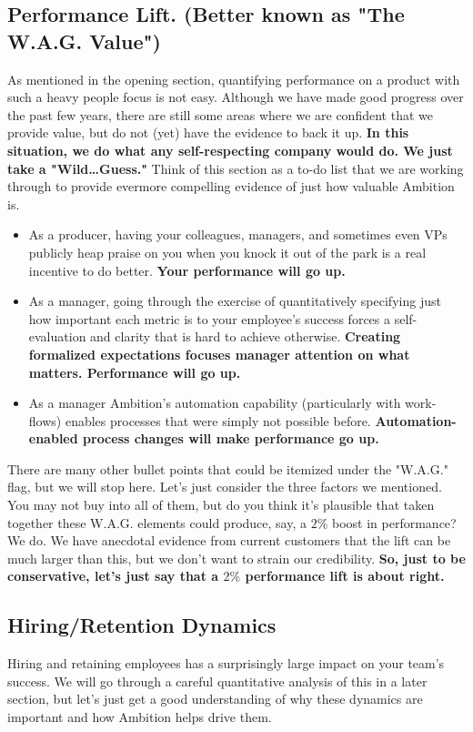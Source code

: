 \documentclass[paper=a4, fontsize=11pt abstract]{scrartcl}
\numberwithin{equation}{section}		%
\numberwithin{figure}{section}			%
\numberwithin{table}{section}				%
\begin{document}
\subsection{Performance Lift. (Better known as "The W.A.G. Value")}
As mentioned in the opening section, quantifying performance on a product with such a heavy people focus is not easy.  Although we have made good progress over the past few years, there are still some areas where we are confident that we provide value, but do not (yet) have the evidence to back it up.  \textbf{In this situation, we do what any self-respecting company would do. We just take a "Wild\ldots Guess."} Think of this section as a to-do list that we are working through to provide evermore compelling evidence of just how valuable Ambition is.
\begin{itemize}
    \item As a producer, having your colleagues, managers, and sometimes even VPs publicly heap praise on you when you knock it out of the park is a real incentive to do better.  \textbf{Your performance will go up.} 
    
    \item As a manager, going through the exercise of quantitatively specifying just how important each metric is to your employee's success forces a self-evaluation and clarity that is hard to achieve otherwise. \textbf{Creating formalized expectations focuses manager attention on what matters.  Performance will go up.}
    
    \item As a manager Ambition's automation capability (particularly with work-flows) enables processes that were simply not possible before. \textbf{Automation-enabled process changes will make performance go up.}
\end{itemize}

There are many other bullet points that could be itemized under the "W.A.G." flag, but we will stop here.  Let's just consider the three factors we mentioned.  You may not buy into all of them, but do you think it's plausible that taken together these W.A.G. elements could produce, say,  a $2\%$ boost in performance?  We do. We have anecdotal evidence from current customers that the lift can be much larger than this, but we don't want to strain our credibility. \textbf{So, just to be conservative, let's just say that a $2\%$ performance lift is about right.}

\subsection{Hiring/Retention Dynamics}
Hiring and retaining employees has a surprisingly large impact on your team's success.  We will go through a careful quantitative analysis of this in a later section, but let's just get a good understanding of why these dynamics are important and how Ambition helps drive them.
\end{document}
